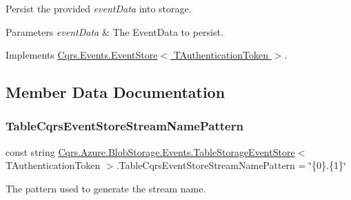 Persist the provided {\itshape event\+Data}  into storage. 


\begin{DoxyParams}{Parameters}
{\em event\+Data} & The Event\+Data to persist.\\
\hline
\end{DoxyParams}


Implements \hyperlink{classCqrs_1_1Events_1_1EventStore_aedb71ca0ddf21220e323bc60ad7508cd_aedb71ca0ddf21220e323bc60ad7508cd}{Cqrs.\+Events.\+Event\+Store$<$ T\+Authentication\+Token $>$}.



\subsection{Member Data Documentation}
\mbox{\label{classCqrs_1_1Azure_1_1BlobStorage_1_1Events_1_1TableStorageEventStore_a6e64df5250bd136250259e0a573097e4_a6e64df5250bd136250259e0a573097e4}} 
\subsubsection{\texorpdfstring{Table\+Cqrs\+Event\+Store\+Stream\+Name\+Pattern}{TableCqrsEventStoreStreamNamePattern}}
{\footnotesize\ttfamily const string \hyperlink{classCqrs_1_1Azure_1_1BlobStorage_1_1Events_1_1TableStorageEventStore}{Cqrs.\+Azure.\+Blob\+Storage.\+Events.\+Table\+Storage\+Event\+Store}$<$ T\+Authentication\+Token $>$.Table\+Cqrs\+Event\+Store\+Stream\+Name\+Pattern = \char`\"{}\{0\}.\{1\}\char`\"{}\hspace{0.3cm}{\ttfamily [protected]}}



The pattern used to generate the stream name. 



